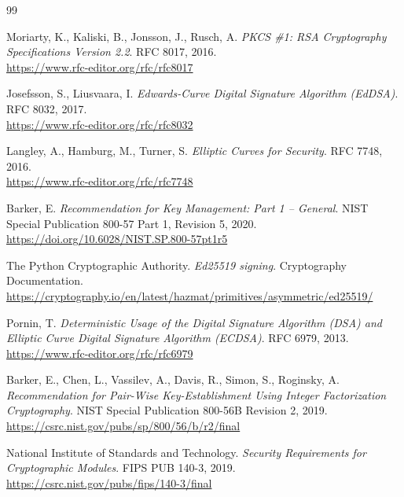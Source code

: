 \documentclass[12pt,a4paper]{article}
\begin{document}
\begin{thebibliography}{99} 

    Moriarty, K., Kaliski, B., Jonsson, J., Rusch, A.
    \textit{PKCS \#1: RSA Cryptography Specifications Version 2.2}.
    RFC 8017, 2016.
    \\
    \url{https://www.rfc-editor.org/rfc/rfc8017}

    Josefsson, S., Liusvaara, I.
    \textit{Edwards-Curve Digital Signature Algorithm (EdDSA)}.
    RFC 8032, 2017.
    \\
    \url{https://www.rfc-editor.org/rfc/rfc8032}

    Langley, A., Hamburg, M., Turner, S.
    \textit{Elliptic Curves for Security}.
    RFC 7748, 2016.
    \\
    \url{https://www.rfc-editor.org/rfc/rfc7748}

    Barker, E.
    \textit{Recommendation for Key Management: Part 1 -- General}.
    NIST Special Publication 800-57 Part 1, Revision 5, 2020.
    \\
    \url{https://doi.org/10.6028/NIST.SP.800-57pt1r5}

    The Python Cryptographic Authority.
    \textit{Ed25519 signing}.
    Cryptography Documentation.
    \\
    \url{https://cryptography.io/en/latest/hazmat/primitives/asymmetric/ed25519/}

    Pornin, T.
    \textit{Deterministic Usage of the Digital Signature Algorithm (DSA) and Elliptic Curve Digital Signature Algorithm (ECDSA)}.
    RFC 6979, 2013.
    \\
    \url{https://www.rfc-editor.org/rfc/rfc6979}

    Barker, E., Chen, L., Vassilev, A., Davis, R., Simon, S., Roginsky, A.
    \textit{Recommendation for Pair-Wise Key-Establishment Using Integer Factorization Cryptography}.
    NIST Special Publication 800-56B Revision 2, 2019.
    \\
    \url{https://csrc.nist.gov/pubs/sp/800/56/b/r2/final}

    National Institute of Standards and Technology.
    \textit{Security Requirements for Cryptographic Modules}.
    FIPS PUB 140-3, 2019.
    \\
    \url{https://csrc.nist.gov/pubs/fips/140-3/final}

\end{thebibliography}
\end{document}
